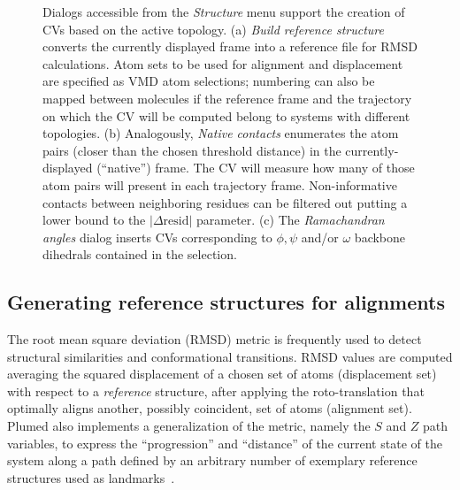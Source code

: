 \documentclass[preprint,review,11pt]{elsarticle}
\begin{document}
\begin{figure}
  \caption{Dialogs accessible from the \emph{Structure} menu support
    the creation of CVs based on the active topology. (a) \emph{Build
      reference structure} converts the currently displayed frame into
    a reference file for RMSD calculations.  Atom sets to be used for
    alignment and displacement are specified as VMD atom selections;
    numbering can also be mapped between molecules if the reference
    frame and the trajectory on which the CV will be computed belong
    to systems with different topologies. (b) Analogously,
    \emph{Native contacts} enumerates  the atom pairs (closer
    than the chosen threshold distance) in the currently-displayed
    (``native'') frame. The CV will measure how many of
    those atom pairs will present in each trajectory frame. 
    Non-informative contacts between neighboring residues can be
    filtered out putting a lower bound to the $| \Delta \mbox{resid}
    |$ parameter. (c) The \emph{Ramachandran angles} dialog inserts
    CVs corresponding to $\phi, \psi$ and/or $\omega$ backbone
    dihedrals contained in the selection.}\label{fig:structure}
\end{figure}

\subsection{Generating reference structures for alignments}


The root mean square deviation (RMSD) metric is frequently used to
detect structural similarities and conformational transitions.  RMSD
values are computed averaging the squared displacement of a chosen set
of atoms (displacement set) with respect to a \emph{reference}
structure,  after applying the roto-translation that optimally
aligns another, possibly coincident, set of atoms (alignment set).   
Plumed also implements a generalization
of the metric, namely the $S$ and $Z$ path variables, to express
the ``progression'' and ``distance'' of the current state of the
system along a path defined by an arbitrary number of exemplary
reference structures used as
landmarks~\cite{Branduardi_Gervasio_Parrinello_2007}.




\end{document}
